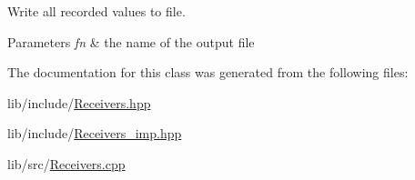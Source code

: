 Write all recorded values to file. 


\begin{DoxyParams}{Parameters}
{\em fn} & the name of the output file \\
\hline
\end{DoxyParams}


The documentation for this class was generated from the following files\-:\begin{DoxyCompactItemize}
\item 
lib/include/\hyperlink{Receivers_8hpp}{Receivers.\-hpp}\item 
lib/include/\hyperlink{Receivers__imp_8hpp}{Receivers\-\_\-imp.\-hpp}\item 
lib/src/\hyperlink{Receivers_8cpp}{Receivers.\-cpp}\end{DoxyCompactItemize}
